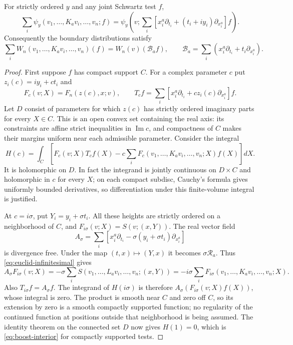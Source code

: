 \begin{proposition}\label{prop:boost-ward}
For strictly ordered $y$ and any joint Schwartz test $f$,
\begin{equation}\label{eq:boost-interior}
 \sum_i\psi_y(v_1,\ldots,K_av_i,\ldots,v_n;f)
  =\psi_y\left(v;\sum_i
       [x_i^a\partial_{t_i}+(t_i+iy_i)\partial_{x_i^a}]f\right).
\end{equation}
Consequently the boundary distributions satisfy
\begin{equation}\label{eq:boost-boundary}
 \sum_i W_n(v_1,\ldots,K_av_i,\ldots,v_n)(f)
  =W_n(v)(\mathcal B_af),\qquad
 \mathcal B_a=\sum_i(x_i^a\partial_{t_i}+t_i\partial_{x_i^a}).
\end{equation}
\end{proposition}
\begin{proof}
First suppose $f$ has compact support $C$. For a complex parameter $c$ put
$z_i(c)=iy_i+ct_i$ and
\[
 F_c(v;X)=F_n(z(c),x;v),\qquad
 T_c f=\sum_i[x_i^a\partial_{t_i}+c z_i(c)\partial_{x_i^a}]f.
\]
Let $D$ consist of parameters for which $z(c)$ has strictly ordered
imaginary parts for every $X\in C$. This is an open convex set containing
the real axis: its constraints are affine strict inequalities in
$\operatorname{Im}c$, and compactness of $C$ makes their margins uniform
near each admissible parameter. Consider the integral
\[
 H(c)=\int_C\left[F_c(v;X)T_cf(X)
       -c\sum_iF_c(v_1,\ldots,K_av_i,\ldots,v_n;X)f(X)\right]dX.
\]
It is holomorphic on $D$. In fact the integrand is jointly continuous on
$D\times C$ and holomorphic in $c$ for every $X$; on each compact subdisc,
Cauchy's formula gives uniformly bounded derivatives, so differentiation
under this finite-volume integral is justified.

At $c=i\sigma$, put $Y_i=y_i+\sigma t_i$. All these heights are strictly
ordered on a neighborhood of $C$, and $F_{i\sigma}(v;X)=S(v;(x,Y))$.
The real vector field
\[
 A_\sigma=\sum_i\left[x_i^a\partial_{t_i}
                      -\sigma(y_i+\sigma t_i)\partial_{x_i^a}\right]
\]
is divergence free. Under the map $(t,x)\mapsto(Y,x)$ it becomes
$\sigma\mathcal R_a$. Thus \eqref{eq:euclid-infinitesimal} gives
\[
 A_\sigma F_{i\sigma}(v;X)
       =-\sigma\sum_iS(v_1,\ldots,L_av_i,\ldots,v_n;(x,Y))
       =-i\sigma\sum_i F_{i\sigma}(v_1,\ldots,K_av_i,\ldots,v_n;X).
\]
Also $T_{i\sigma}f=A_\sigma f$. The integrand of $H(i\sigma)$ is
therefore $A_\sigma(F_{i\sigma}(v;X)f(X))$, whose integral is zero.
The product is smooth near $C$ and zero off $C$, so its extension by zero
is a smooth compactly supported function; no regularity of the continued
function at positions outside that neighborhood is being assumed.
The identity theorem on the connected set $D$ now gives $H(1)=0$,
which is \eqref{eq:boost-interior} for compactly supported tests.


\end{proof}
